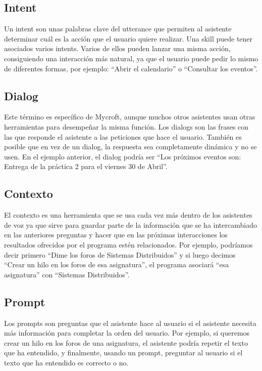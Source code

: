 \subsection{Intent}
Un intent son unas palabras clave del utterance que permiten al asistente determinar cuál es la acción que el usuario quiere realizar. Una skill puede tener asociados varios intents. Varios de ellos pueden lanzar una misma acción, consiguiendo una interacción más natural, ya que el usuario puede pedir lo mismo de diferentes formas, por ejemplo: ``Abrir el calendario'' o ``Consultar los eventos''.

\subsection{Dialog}
Este término es específico de Mycroft, aunque muchos otros asistentes usan otras herramientas para desempeñar la misma función. Los dialogs son las frases con las que responde el asistente a las peticiones que hace el usuario. También es posible que en vez de un dialog, la respuesta sea completamente dinámica y no se usen. En el ejemplo anterior, el dialog podría ser ``Los próximos eventos son: Entrega de la práctica 2 para el viernes 30 de Abril''.

\subsection{Contexto}
El contexto es una herramienta que se usa cada vez más dentro de los asistentes de voz ya que sirve para guardar parte de la información que se ha intercambiado en las anteriores preguntas y hacer que en las próximas interacciones los resultados ofrecidos por el programa estén relacionados. Por ejemplo, podríamos decir primero ``Dime los foros de Sistemas Distribuidos'' y si luego decimos ``Crear un hilo en los foros de esa asignatura'', el programa asociará ``esa asignatura'' con ``Sistemas Distribuidos''.

\subsection{Prompt}
Los prompts son preguntas que el asistente hace al usuario si el asistente necesita más información para completar la orden del usuario. Por ejemplo, si queremos crear un hilo en los foros de una asignatura, el asistente podría repetir el texto que ha entendido, y finalmente, usando un prompt, preguntar al usuario si el texto que ha entendido es correcto o no.

